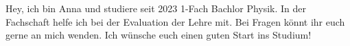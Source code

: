\begin{multicols}{2}
\vspace{-0.15cm}

{
Hey, ich bin Anna und studiere seit 2023 1-Fach Bachlor Physik. In der Fachschaft helfe ich bei der Evaluation der Lehre mit. Bei Fragen könnt ihr euch gerne an mich wenden.
Ich wünsche euch einen guten Start ins Studium!
}


\end{multicols}
